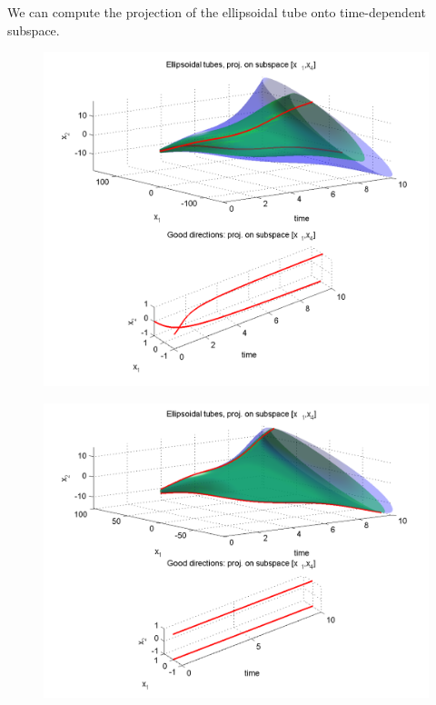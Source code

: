 \documentclass[letterpaper,10pt,english]{sphinxmanual}
\begin{document}
We can compute the projection of the ellipsoidal
tube onto time-dependent subspace.
\begin{figure}[htbp]
\centering

\includegraphics{reachTubeStatProj.png}
\label{main_source:stat-proj}\end{figure}
\begin{figure}[htbp]
\centering

\includegraphics{reachTubeDynProj.png}
\label{main_source:dyn-proj}\end{figure}
\end{document}
